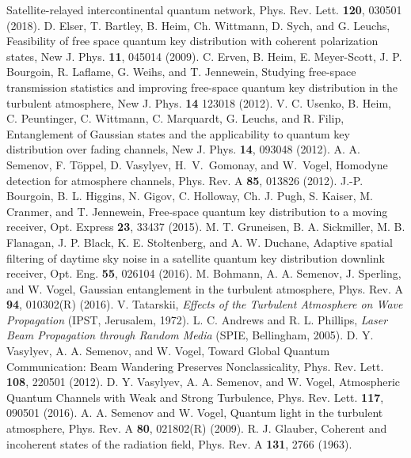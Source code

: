 \documentclass[aps,pra,twocolumn,a4paper,nofootinbib,preprintnumbers] {revtex4-1}
\begin{document}
\begin{thebibliography}{99}
	Satellite-relayed intercontinental quantum network,
	Phys. Rev. Lett. \textbf{120}, 030501 (2018).
	D. Elser, T. Bartley, B. Heim, Ch. Wittmann, D. Sych, and G. Leuchs,
	Feasibility of free space quantum key distribution with coherent polarization states,
	New J. Phys. \textbf{11}, 045014 (2009).
	C. Erven, B. Heim, E. Meyer-Scott, J. P. Bourgoin, R. Laflame, G. Weihs, and T. Jennewein,
	Studying free-space transmission statistics and improving free-space quantum key distribution in the turbulent atmosphere,
	New J. Phys. \textbf{14}  123018 (2012).
	V. C. Usenko, B. Heim, C. Peuntinger, C. Wittmann, C. Marquardt, G. Leuchs, and R. Filip,
	Entanglement of Gaussian states and the applicability to quantum key distribution over fading channels,
	New J. Phys. \textbf{14}, 093048 (2012).
	A. A. Semenov, F. T\"oppel, D. Vasylyev, H.~V.~Gomonay, and W.~Vogel, Homodyne detection for atmosphere channels, Phys. Rev. A \textbf{85}, 013826 (2012).
	J.-P. Bourgoin, B. L. Higgins, N. Gigov, C. Holloway, Ch. J. Pugh, S. Kaiser, M. Cranmer, and T. Jennewein, Free-space quantum key distribution to a moving receiver,
	Opt. Express \textbf{23}, 33437 (2015).
	M. T. Gruneisen, B. A. Sickmiller, M. B. Flanagan, J. P. Black, K. E. Stoltenberg, and A. W. Duchane,
	Adaptive spatial filtering of daytime sky noise in a satellite quantum key distribution downlink receiver,
	Opt. Eng. \textbf{55}, 026104 (2016).
	M. Bohmann, A. A. Semenov, J. Sperling, and W. Vogel,
	Gaussian entanglement in the turbulent atmosphere,
	Phys. Rev. A \textbf{94}, 010302(R) (2016).	
	V. Tatarskii,
	\textit{Effects of the Turbulent Atmosphere on Wave Propagation} (IPST, Jerusalem, 1972).
	L. C. Andrews and R. L. Phillips,
	\textit{Laser Beam Propagation through Random Media} (SPIE, Bellingham, 2005).
	D. Y. Vasylyev, A. A. Semenov, and W. Vogel,
	Toward Global Quantum Communication: Beam Wandering Preserves Nonclassicality,
	Phys. Rev. Lett. \textbf{108}, 220501 (2012).
	D. Y. Vasylyev, A. A. Semenov, and W. Vogel,
	Atmospheric Quantum Channels with Weak and Strong Turbulence,
	Phys. Rev. Lett. \textbf{117}, 090501 (2016).
	A. A. Semenov and W. Vogel,
	Quantum light in the turbulent atmosphere,
	Phys. Rev. A \textbf{80}, 021802(R) (2009).
	R. J. Glauber,
	Coherent and incoherent states of the radiation field,
	Phys. Rev. A \textbf{131}, 2766 (1963).

\end{thebibliography}
\end{document}
